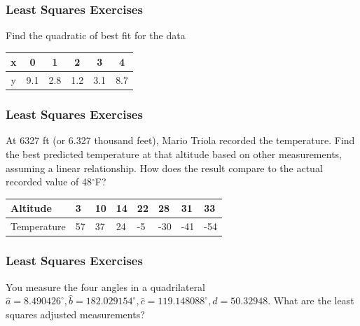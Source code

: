 \documentclass[xcolor=dvipsnames]{beamer}
\begin{document}
\begin{frame}
  \frametitle{Least Squares Exercises}
  {\ubung} Find the quadratic of best fit for the data

  \bigskip
  
  \begin{tabular}{c|ccccc}
    x & 0 & 1 & 2 & 3 & 4 \\ \hline
    y & 9.1 & 2.8 & 1.2 & 3.1 & 8.7
  \end{tabular}
\end{frame}

\begin{frame}
  \frametitle{Least Squares Exercises}
  {\ubung} At 6327 ft (or 6.327 thousand feet), Mario Triola recorded
  the temperature. Find the best predicted temperature at that
  altitude based on other measurements, assuming a linear
  relationship. How does the result compare to the actual recorded
  value of 48$^{\circ}$F?


  \bigskip

\begin{tabular}{|l|l|l|l|l|l|l|l|}
\hline
Altitude & 3 & 10 & 14 & 22 & 28 & 31 & 33 \\
\hline
Temperature & 57 & 37 & 24 & -5 & -30 & -41 & -54 \\
\hline
\end{tabular}
\end{frame}

\begin{frame}
  \frametitle{Least Squares Exercises}
  {\ubung} You measure the four angles in a quadrilateral
  $\hat{a}=8.490426^{\circ},\hat{b}=182.029154^{\circ},\hat{c}=119.148088^{\circ},\hat{d}=50.32948$.
  What are the least squares adjusted measurements?
\end{frame}
\end{document}
